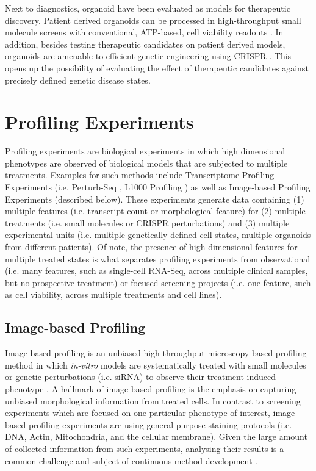 \begin{flushleft}
Next to diagnostics, organoid have been evaluated as models for therapeutic discovery. Patient derived organoids can be processed in high-throughput small molecule screens with conventional, ATP-based, cell viability readouts \citep{vandeweteringProspectiveDerivationLiving2015}. In addition, besides testing therapeutic candidates on patient derived models, organoids are amenable to efficient genetic engineering using CRISPR \citep{matanoModelingColorectalCancer2015a, drostSequentialCancerMutations2015}. This opens up the possibility of evaluating the effect of therapeutic candidates against precisely defined genetic disease states.

\section{Profiling Experiments} 

Profiling experiments are biological experiments in which high dimensional phenotypes are observed of biological models that are subjected to multiple treatments. Examples for such methods include Transcriptome Profiling Experiments (i.e. Perturb-Seq \citep{dixitPerturbSeqDissectingMolecular2016}, L1000 Profiling \citep{subramanianNextGenerationConnectivity2017}) as well as Image-based Profiling Experiments \citep{caicedoApplicationsImagebasedProfiling2016} (described below). These experiments generate data containing (1) multiple features (i.e. transcript count or morphological feature) for (2) multiple treatments (i.e. small molecules or CRISPR perturbations) and (3) multiple experimental units (i.e. multiple genetically defined cell states, multiple organoids from different patients). Of note, the presence of high dimensional features for multiple treated states is what separates profiling experiments from observational (i.e. many features, such as single-cell RNA-Seq, across multiple clinical samples, but no prospective treatment) or focused screening projects (i.e. one feature, such as cell viability, across multiple treatments and cell lines). 

\subsection{Image-based Profiling}

Image-based profiling is an unbiased high-throughput microscopy based profiling method in which \textit{in-vitro} models are systematically treated with small molecules or genetic perturbations (i.e. siRNA) to observe their treatment-induced phenotype \citep{carpenterImagebasedChemicalScreening2007, caicedoApplicationsImagebasedProfiling2016}. A hallmark of image-based profiling is the emphasis on capturing unbiased morphological information from treated cells. In contrast to screening experiments which are focused on one particular phenotype of interest, image-based profiling experiments are using general purpose staining protocols (i.e. DNA, Actin, Mitochondria, and the cellular membrane). Given the large amount of collected information from such experiments, analysing their results is a common challenge and subject of continuous method development \citep{chandrasekaranImagebasedProfilingDrug2021}. 
\par


\end{flushleft}
